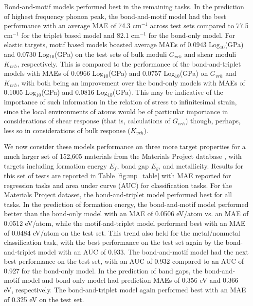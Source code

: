\documentclass[10pt,a4paper,twocolumn]{article}
\begin{document}
Bond-and-motif models performed best in the remaining tasks. In the prediction of highest frequency phonon peak, the bond-and-motif model had the best performance with an average MAE of 74.3 cm$^{-1}$ across test sets compared to 77.5 cm$^{-1}$ for the triplet based model and 82.1 cm$^{-1}$ for the bond-only model. For elastic targets, motif based models boasted average MAEs of 0.0943 Log$_{10}$(GPa) and 0.0730 Log$_{10}$(GPa) on the test sets of bulk moduli $G_{vrh}$ and shear moduli $K_{vrh}$, respectively. This is compared to the performance of the bond-and-triplet models with MAEs of 0.0966 Log$_{10}$(GPa) and 0.0757 Log$_{10}$(GPa) on $G_{vrh}$ and $K_{vrh}$, with both being an improvement over the bond-only models with MAEs of 0.1005 Log$_{10}$(GPa) and 0.0816 Log$_{10}$(GPa). This may be indicative of the importance of such information in the relation of stress to infinitesimal strain, since the local environments of atoms would be of particular importance in considerations of shear response (that is, calculations of $G_{vrh}$) though, perhaps, less so in considerations of bulk response ($K_{vrh}$). %


We now consider these models performance on three more target properties for a much larger set of 152,605
materials from the Materials Project database \cite{matproj}, with targets including formation energy $E_f$, band gap $E_g$, and metallicity.  Results for this set of tests are reported in Table \ref{fig:mp_table} with MAE reported for regression tasks and area under curve (AUC) for classification tasks. 
For the Materials Project dataset, the bond-and-triplet model performed best for all tasks. In the prediction of formation energy, the bond-and-motif model performed better than the bond-only model with an MAE of 0.0506 eV/atom vs. an MAE of 0.0512 eV/atom, while the motif-and-triplet model performed best with an MAE of 0.0484 eV/atom on the test set. This trend also held for the metal/nonmetal classification task, with the best performance on the test set again by the bond-and-triplet model with an AUC of 0.933. The bond-and-motif model had the next best performance on the test set, with an AUC of 0.932 compared to an AUC of 0.927 for the bond-only model. In the prediction of band gaps, the bond-and-motif model and bond-only model had prediction MAEs of 0.356 eV and 0.366 eV, respectively. The bond-and-triplet model again performed best with an MAE of 0.325 eV on the test set. 
\end{document}
